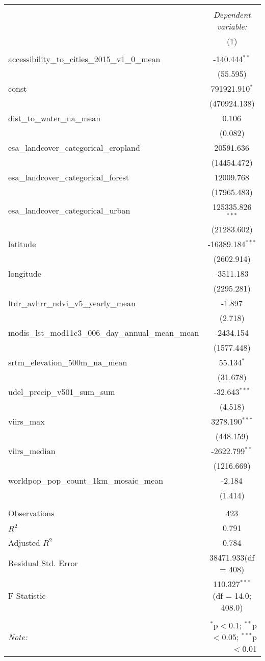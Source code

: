 \begin{table}[!htbp] \centering
\begin{tabular}{@{\extracolsep{5pt}}lc}
\\[-1.8ex]\hline
\hline \\[-1.8ex]
& \multicolumn{1}{c}{\textit{Dependent variable:}} \
\cr \cline{1-2}
\\[-1.8ex] & (1) \\
\hline \\[-1.8ex]
 accessibility_to_cities_2015_v1_0_mean & -140.444$^{**}$ \\
  & (55.595) \\
 const & 791921.910$^{*}$ \\
  & (470924.138) \\
 dist_to_water_na_mean & 0.106$^{}$ \\
  & (0.082) \\
 esa_landcover_categorical_cropland & 20591.636$^{}$ \\
  & (14454.472) \\
 esa_landcover_categorical_forest & 12009.768$^{}$ \\
  & (17965.483) \\
 esa_landcover_categorical_urban & 125335.826$^{***}$ \\
  & (21283.602) \\
 latitude & -16389.184$^{***}$ \\
  & (2602.914) \\
 longitude & -3511.183$^{}$ \\
  & (2295.281) \\
 ltdr_avhrr_ndvi_v5_yearly_mean & -1.897$^{}$ \\
  & (2.718) \\
 modis_lst_mod11c3_006_day_annual_mean_mean & -2434.154$^{}$ \\
  & (1577.448) \\
 srtm_elevation_500m_na_mean & 55.134$^{*}$ \\
  & (31.678) \\
 udel_precip_v501_sum_sum & -32.643$^{***}$ \\
  & (4.518) \\
 viirs_max & 3278.190$^{***}$ \\
  & (448.159) \\
 viirs_median & -2622.799$^{**}$ \\
  & (1216.669) \\
 worldpop_pop_count_1km_mosaic_mean & -2.184$^{}$ \\
  & (1.414) \\
\hline \\[-1.8ex]
 Observations & 423 \\
 $R^2$ & 0.791 \\
 Adjusted $R^2$ & 0.784 \\
 Residual Std. Error & 38471.933(df = 408)  \\
 F Statistic & 110.327$^{***}$ (df = 14.0; 408.0) \\
\hline
\hline \\[-1.8ex]
\textit{Note:} & \multicolumn{1}{r}{$^{*}$p$<$0.1; $^{**}$p$<$0.05; $^{***}$p$<$0.01} \\
\end{tabular}
\end{table}